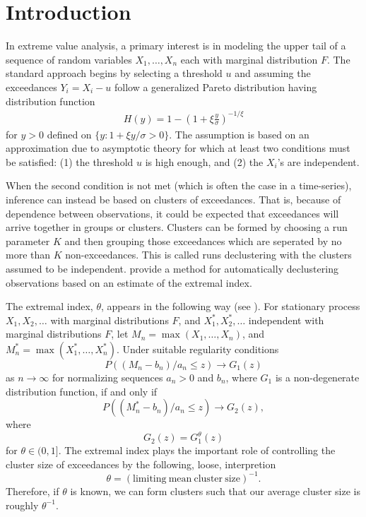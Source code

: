 \section{Introduction}
\label{intro}

In extreme value analysis, a primary interest is in modeling the upper tail of a sequence of random variables $X_1,\ldots,X_n$ each with marginal distribution $F$. The standard approach begins by selecting a threshold $u$ and assuming the exceedances $Y_i=X_i-u$ follow a generalized Pareto distribution having distribution function
\begin{align}
H(y) = 1 - \left(1 + \xi \frac{y}{\sigma}\right)^{-1/\xi} \label{gpmod}
\end{align}
for $y>0$ defined on $\{y:1+\xi y/\sigma>0\}$. The assumption is based on an approximation due to asymptotic theory for which at least two conditions must be satisfied: (1) the threshold $u$ is high enough, and (2) the $X_i$'s are independent.

When the second condition is not met (which is often the case in a time-series), inference can instead be based on clusters of exceedances. That is, because of dependence between observations, it could be expected that exceedances will arrive together in groups or clusters. Clusters can be formed by choosing a run parameter $K$ and then grouping those exceedances which are seperated by no more than $K$ non-exceedances. This is called runs declustering with the clusters assumed to be independent. \cite{ferro2003inference} provide a method for automatically declustering observations based on an estimate of the extremal index.

The extremal index, $\theta$, appears in the following way (see \cite{coles2001introduction}). For stationary process $X_1,X_2,\ldots$ with marginal distributions $F$, and $X_1^*,X_2^*,\ldots$ independent with marginal distributions $F$, let $M_n=\max(X_1,\ldots,X_n)$, and $M_n^*=\max(X_1^*,\ldots,X_n^*)$. Under suitable regularity conditions
\[ P((M_n-b_n)/a_n \leq z) \rightarrow G_1(z) \]
as $n\rightarrow\infty$ for normalizing sequences $a_n>0$ and $b_n$, where $G_1$ is a non-degenerate distribution function, if and only if
\[ P((M_n^*-b_n)/a_n \leq z) \rightarrow G_2(z),\]
where
\[ G_2(z)=G_1^\theta(z) \]
for $\theta\in(0,1]$. The extremal index plays the important role of controlling the cluster size of exceedances by the following, loose, interpretion
\[ \theta = (\mathrm{limiting~mean~cluster~size})^{-1}. \]
Therefore, if $\theta$ is known, we can form clusters such that our average cluster size is roughly $\theta^{-1}$.

